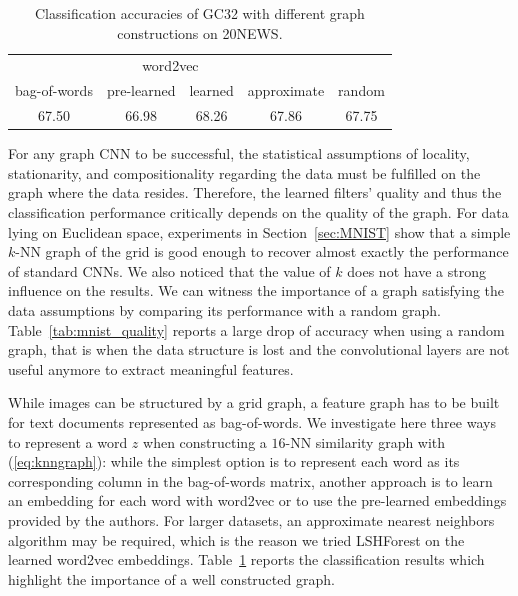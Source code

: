 \documentclass{article}
\newcommand{\tabref}[1]{Table~\ref{tab:#1}}
\newcommand{\secref}[1]{Section~\ref{sec:#1}}
\newcommand{\eqnref}[1]{(\ref{eq:#1})}
\begin{document}
\begin{table}[t] \centering
\begin{tabular}{ccccc} \toprule
& \multicolumn{2}{c}{word2vec} & & \\
bag-of-words & pre-learned & learned & approximate & random \\
\midrule
67.50 & 66.98 & 68.26 & 67.86 & 67.75 \\
\bottomrule \end{tabular}
\caption{Classification accuracies of GC32 with different graph constructions on 20NEWS.} 
\label{tab4b}
\label{tab:20news_quality}
\end{table}



For any graph CNN to be successful, the statistical assumptions of locality,
stationarity, and compositionality regarding the data must be fulfilled on the
graph where the data resides. Therefore, the learned filters' quality and thus
the classification performance critically depends on the quality of the graph.
For data lying on Euclidean space, experiments in \secref{MNIST} show that a
simple $k$-NN graph of the grid is good enough to recover almost exactly the
performance of standard CNNs. We also noticed that the value of $k$ does not
have a strong influence on the results. We can witness the importance of a
graph satisfying the data assumptions by comparing its performance with a
random graph. \tabref{mnist_quality} reports a large drop of accuracy when
using a random graph, that is when the data structure is lost and the
convolutional layers are not useful anymore to extract meaningful features.

While images can be structured by a grid graph, a feature graph has to be built
for text documents represented as bag-of-words.  We investigate here three ways
to represent a word $z$ when constructing a $16$-NN similarity graph with
\eqnref{knngraph}: while the simplest option is to represent each word as its
corresponding column in the bag-of-words matrix, another approach is to learn
an embedding for each word with word2vec
\cite{pro:MikolovChenCorradoDean13word2vec} or to use the pre-learned
embeddings provided by the authors. For larger datasets, an approximate nearest
neighbors algorithm may be required, which is the reason we tried LSHForest
\cite{pro:BawaCondieGanesan05LSHForest} on the learned word2vec embeddings.
\tabref{20news_quality} reports the classification results which highlight the
importance of a well constructed graph.
\end{document}
